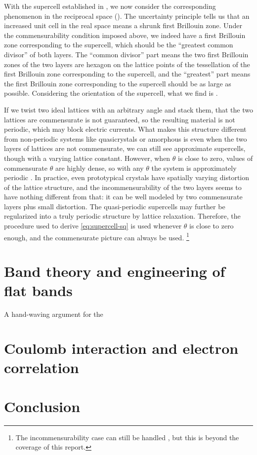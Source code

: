 \documentclass[hyperref, a4paper]{article}
\begin{document}
With the supercell established in ,
we now consider the corresponding phenomenon in the reciprocal space
().
The uncertainty principle tells us that an increased unit cell in the real space 
means a shrunk first Brillouin zone.
Under the commensurability condition imposed above,
we indeed have a first Brillouin zone corresponding to the supercell,
which should be the ``greatest common divisor'' of both layers.
The ``common divisor'' part means the two first Brillouin zones of the two layers 
are hexagon on the lattice points of the tessellation 
of the first Brillouin zone corresponding to the supercell,
and the ``greatest'' part means the first Brillouin zone corresponding to the supercell
should be as large as possible.
Considering the orientation of the supercell,
what we find is .

If we twist two ideal lattices with an arbitrary angle and stack them,
that the two lattices are commensurate is not guaranteed,
so the resulting material is not periodic,
which may block electric currents.
What makes this structure different from non-periodic systems like quasicrystals or amorphous is 
even when the two layers of lattices are not commensurate,
we can still see approximate supercells,
though with a varying lattice constant.
However, when $\theta$ is close to zero,
values of commensurate $\theta$ are highly dense,
so with any $\theta$ the system is approximately periodic \cite{yao_quasicrystalline_2018}.
In practice, even prototypical crystals have spatially varying distortion of the lattice structure,
and the incommensurability of the two layers seems to have nothing different from that:
it can be well modeled by two commensurate layers plus small distortion.
The quasi-periodic supercells may further be regularized into a truly periodic structure by lattice relaxation.
Therefore, the procedure used to derive \eqref{eq:supercell-sq} is used
whenever $\theta$ is close to zero enough,
and the commensurate picture can always be used.%
\footnote{
    The incommensurability case can still be handled \cite{catarina_twisted_2019},  
    but this is beyond the coverage of this report.
}

\section{Band theory and engineering of flat bands}

A hand-waving argument for the 

\section{Coulomb interaction and electron correlation}

\section{Conclusion}



\end{document}
